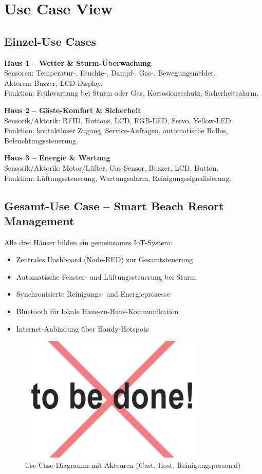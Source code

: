 \section{Use Case View}

\subsection{Einzel-Use Cases}
\textbf{Haus 1 – Wetter \& Sturm-Überwachung}\\
Sensoren: Temperatur-, Feuchte-, Dampf-, Gas-, Bewegungsmelder.\\
Aktoren: Buzzer, LCD-Display.\\
Funktion: Frühwarnung bei Sturm oder Gas, Korrosionsschutz, Sicherheitsalarm.

\vspace{0.5em}
\textbf{Haus 2 – Gäste-Komfort \& Sicherheit}\\
Sensorik/Aktorik: RFID, Buttons, LCD, RGB-LED, Servo, Yellow-LED.\\
Funktion: kontaktloser Zugang, Service-Anfragen, automatische Rollos, Beleuchtungssteuerung.

\vspace{0.5em}
\textbf{Haus 3 – Energie \& Wartung}\\
Sensorik/Aktorik: Motor/Lüfter, Gas-Sensor, Buzzer, LCD, Button.\\
Funktion: Lüftungssteuerung, Wartungsalarm, Reinigungssignalisierung.

\subsection{Gesamt-Use Case – Smart Beach Resort Management}
Alle drei Häuser bilden ein gemeinsames IoT-System:
\begin{itemize}[noitemsep]
	\item Zentrales Dashboard (Node-RED) zur Gesamtsteuerung
	\item Automatische Fenster- und Lüftungssteuerung bei Sturm
	\item Synchronisierte Reinigungs- und Energieprozesse
	\item Bluetooth für lokale Haus-zu-Haus-Kommunikation
	\item Internet-Anbindung über Handy-Hotspots
\end{itemize}

\begin{figure}[h!]
	\centering
	\includegraphics[width=0.8\textwidth]{img/tbd.jpg}
	\caption{Use-Case-Diagramm mit Akteuren (Gast, Host, Reinigungspersonal)}
	\label{fig:systemuebersicht}
\end{figure}



